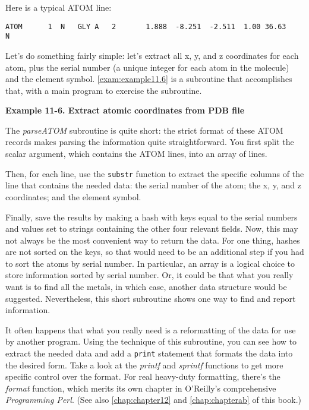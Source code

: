 Here is a typical ATOM line:

\begin{lstlisting}
ATOM      1  N   GLY A   2       1.888  -8.251  -2.511  1.00 36.63           N  
\end{lstlisting}

Let's do something fairly simple: let's extract all x, y, and z coordinates for each atom, plus the serial number (a unique integer for each atom in the molecule) and the element symbol. \autoref{exam:example11.6} is a subroutine that accomplishes that, with a main program to exercise the subroutine. 

\textbf{Example 11-6. Extract atomic coordinates from PDB file}


The \textit{parseATOM} subroutine is quite short: the strict format of these ATOM records makes parsing the information quite straightforward. You first split the scalar argument, which contains the ATOM lines, into an array of lines.

Then, for each line, use the \verb|substr| function to extract the specific columns of the line that contains the needed data: the serial number of the atom; the x, y, and z coordinates; and the element symbol.

Finally, save the results by making a hash with keys equal to the serial numbers and values set to strings containing the other four relevant fields. Now, this may not always be the most convenient way to return the data. For one thing, hashes are not sorted on the keys, so that would need to be an additional step if you had to sort the atoms by serial number. In particular, an array is a logical choice to store information sorted by serial number. Or, it could be that what you really want is to find all the metals, in which case, another data structure would be suggested. Nevertheless, this short subroutine shows one way to find and report information.

It often happens that what you really need is a reformatting of the data for use by another program. Using the technique of this subroutine, you can see how to extract the needed data and add a \verb|print| statement that formats the data into the desired form. Take a look at the \textit{printf} and \textit{sprintf} functions to get more specific control over the format. For real heavy-duty formatting, there's the \textit{format} function, which merits its own chapter in O'Reilly's comprehensive \textit{Programming Perl}. (See also \autoref{chap:chapter12} and \autoref{chap:chapterab} of this book.)

